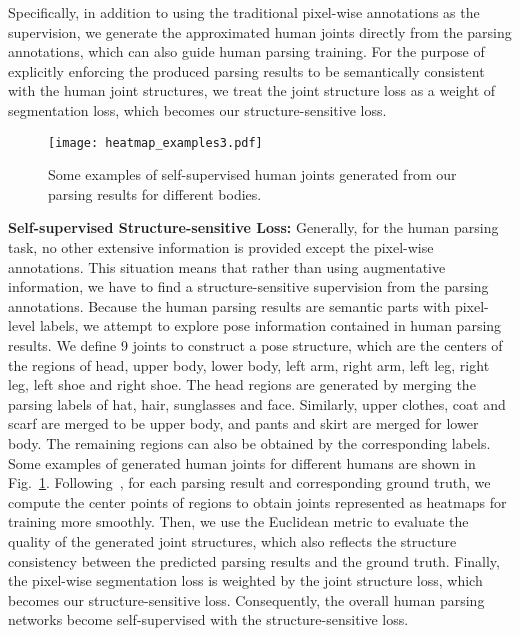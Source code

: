 \documentclass[10pt,journal,compsoc]{IEEEtran}
\begin{document}
Specifically, in addition to using the traditional pixel-wise annotations as the supervision, we generate the approximated human joints directly from the parsing annotations, which can also guide human parsing training. For the purpose of explicitly enforcing the produced parsing results to be semantically consistent with the human joint structures, we treat the joint structure loss as a weight of segmentation loss, which becomes our structure-sensitive loss.



\begin{figure}[t]
\centering
\texttt{[image: heatmap\_examples3.pdf]}
\vspace{-4mm}
\caption{Some examples of self-supervised human joints generated from our parsing results for different bodies.}
\vspace{-2mm}
\label{fig:heatmap_example}
\end{figure}


\textbf{Self-supervised Structure-sensitive Loss: }
Generally, for the human parsing task, no other extensive information is provided except the pixel-wise annotations. This situation means that rather than using augmentative information, we have to find a structure-sensitive supervision from the parsing annotations. Because the human parsing results are semantic parts with pixel-level labels, we attempt to explore pose information contained in human parsing results. We define 9 joints to construct a pose structure, which are the centers of the regions of head, upper body, lower body, left arm, right arm, left leg, right leg, left shoe and right shoe. The head regions are generated by merging the parsing labels of hat, hair, sunglasses and face. Similarly, upper clothes, coat and scarf are merged to be upper body, and pants and skirt are merged for lower body. The remaining regions can also be obtained by the corresponding labels. Some examples of generated human joints for different humans are shown in Fig.~\ref{fig:heatmap_example}. Following~\cite{Pfister15a}, for each parsing result and corresponding ground truth, we compute the center points of regions to obtain joints represented as heatmaps for training more smoothly. Then, we use the Euclidean metric to evaluate the quality of the generated joint structures, which also reflects the structure consistency between the predicted parsing results and the ground truth. Finally, the pixel-wise segmentation loss is weighted by the joint structure loss, which becomes our structure-sensitive loss. Consequently, the overall human parsing networks become self-supervised with the structure-sensitive loss. 
\end{document}
